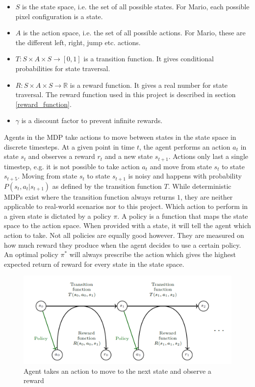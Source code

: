 \documentclass[notitlepage,a4paper,11pt]{article}
\newcommand{\R}{\mathbb{R}}
\begin{document}
\begin{itemize}[noitemsep]
	\item $S$ is the state space, i.e. the set of all possible states. For Mario, each possible pixel configuration is a state.
	\item $A$ is the action space, i.e. the set of all possible actions. For Mario, these are the different left, right, jump etc. actions.
	\item $T : S \times A \times S \to [0,1]$ is a transition function. It gives conditional probabilities for state traversal.
	\item $R : S \times A \times S \to \R$ is a reward function. It gives a real number for state traversal. The reward function used in this project is described in section \ref{reward_function}.
	\item $\gamma$ is a discount factor to prevent infinite rewards.
\end{itemize}

Agents in the MDP take actions to move between states in the state space in discrete timesteps. At a given point in time $t$, the agent performs an action $a_t$ in state $s_t$ and observes a reward $r_t$ and a new state $s_{t+1}$. Actions only last a single timestep, e.g. it is not possible to take action $a_t$ and move from state $s_t$ to state $s_{t+5}$. Moving from state $s_t$ to state $s_{t+1}$ is noisy and happens with probability $P(s_t, a_t | s_{t+1})$ as defined by the transition function $T$. While deterministic MDPs exist where the transition function always returns $1$, they are neither applicable to real-world scenarios nor to this project. Which action to perform in a given state is dictated by a policy $\pi$. A policy is a function that maps the state space to the action space. When provided with a state, it will tell the agent which action to take. Not all policies are equally good however. They are measured on how much reward they produce when the agent decides to use a certain policy. An optimal policy $\pi^*$ will always prescribe the action which gives the highest expected return of reward for every state in the state space.

\begin{figure}[!htb]
\centering
\includegraphics[width=.5\linewidth]{figs/mdp_detail.png}
\caption{Agent takes an action to move to the next state and observe a reward \protect\cite{franccois2018introduction}} \label{fig:2}
\end{figure}
\end{document}
